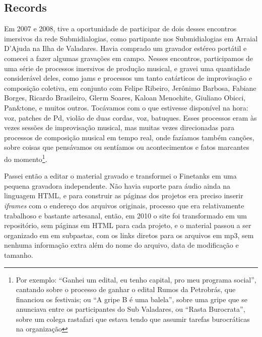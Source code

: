 \subsection{Records}
Em 2007 e 2008, tive a oportunidade de participar de dois desses encontros imersivos da rede Submidialogias, como partipante nos Submidialogias em Arraial D'Ajuda na Ilha de Valadares. Havia comprado um gravador estéreo portátil e comecei a fazer algumas gravações em campo. Nesses encontros, participamos de uma série de processos imersivos de produção musical, e gravei uma quantidade considerável deles, como jams e processos um tanto catárticos de improvisação e composição coletiva, em conjunto com Felipe Ribeiro, Jerônimo Barbosa, Fabiane Borges, Ricardo Brasileiro, Glerm Soares, Kaloan Menochite, Giuliano Obicci, Pan\&tone, e muitos outros. Tocávamos com o que estivesse disponível na hora: voz, patches de Pd, violão de duas cordas, voz, batuques. Esses processos eram às vezes sessões de improvisação musical, mas muitas vezes direcionadas para processos de composição musical em tempo real, onde fazíamos também canções, sobre coisas que pensávamos ou sentíamos ou acontecimentos e fatos marcantes do momento\footnote{Por exemplo: ``Ganhei um edital, eu tenho capital, pro meu programa social'', cantando sobre o processo de ganhar o edital Rumos da Petrobrás, que financiou os festivais; ou ``A gripe B é uma balela'', sobre uma gripe que se anunciava entre os participantes do Sub Valadares, ou ``Rasta Burocrata'', sobre um colega rastafari que estava tendo que assumir tarefas burocráticas na organização}.


Passei então a editar o material gravado e transformei o Finetanks em uma pequena gravadora independente. Não havia suporte para áudio ainda na linguagem HTML, e para construir as páginas dos projetos era preciso inserir \emph{iframes} com o endereço dos arquivos originais, processo que era relativamente trabalhoso e bastante artesanal, então, em 2010 o site foi transformado em um repositório, sem páginas em HTML para cada projeto, e o material passou a ser organizado em em subpastas, com os links diretos para os arquivos em mp3, sem nenhuma informação extra além do nome do arquivo, data de modificação e tamanho. 


